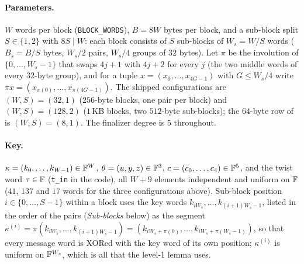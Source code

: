 \paragraph{Parameters.}
$W$ words per block (\texttt{BLOCK\_WORDS}), $B=8W$ bytes per block, and a
sub-block split $S\in\{1,2\}$ with $8S\mid W$: each block consists of $S$
sub-blocks of $W_s=W/S$ words ($B_s=B/S$ bytes, $W_s/2$ pairs, $W_s/4$
groups of $32$ bytes).  Let $\pi$ be the involution of $\{0,\dots,W_s-1\}$
that swaps $4j+1$ with $4j+2$ for every $j$ (the two middle words of every
$32$-byte group), and for a tuple $x=(x_0,\dots,x_{4G-1})$ with $G\le W_s/4$
write $\pi x=(x_{\pi(0)},\dots,x_{\pi(4G-1)})$.  The shipped
configurations are $(W,S)=(32,1)$ ($256$-byte blocks, one pair per block) and
$(W,S)=(128,2)$ ($1$\,KB blocks, two $512$-byte sub-blocks); the $64$-byte row
of  is $(W,S)=(8,1)$.  The finalizer degree is
$5$ throughout.

\paragraph{Key.}
$\kappa=(k_0,\dots,k_{W-1})\in\mathbb{F}^{W}$, $\theta=(u,y,z)\in\mathbb{F}^3$,
$c=(c_0,\dots,c_4)\in\mathbb{F}^5$, and the twist word $\tau\in\mathbb{F}$ (\texttt{t\_in} in
the code), all $W+9$ elements independent and uniform on $\mathbb{F}$ ($41$, $137$
and $17$ words for the three configurations above).  Sub-block
position $i\in\{0,\dots,S-1\}$ within a block uses the key words
$k_{iW_s},\dots,k_{(i+1)W_s-1}$, listed in the order of the pairs
(\emph{Sub-blocks} below) as the segment
$\kappa^{(i)}=\pi(k_{iW_s},\dots,k_{(i+1)W_s-1})=(k_{iW_s+\pi(0)},\dots,k_{iW_s+\pi(W_s-1)})$,
so that every message word is XORed with the key word of its own position;
$\kappa^{(i)}$ is uniform on $\mathbb{F}^{W_s}$, which is all that the level-1
lemma uses.

